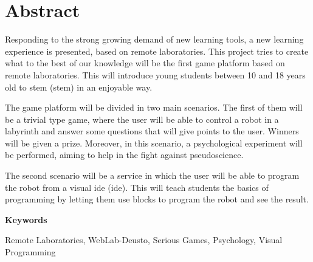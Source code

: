 \chapter*{Abstract}

Responding to the strong growing demand of new learning tools, a new learning experience is
presented, based on remote laboratories. This project tries to create what to the best of our
knowledge will be the first game platform based on remote laboratories. This will introduce young
students between 10 and 18 years old to \acrshort{stem} (\acrlong{stem}) in an enjoyable way.

The game platform will be divided in two main scenarios. The first of them will be a trivial type
game, where the user will be able to control a robot in a labyrinth and answer some questions that
will give points to the user. Winners will be given a prize. Moreover, in this scenario, a
psychological experiment will be performed, aiming to help in the fight against pseudoscience.

The second scenario will be a service in which the user will be able to program the robot from a
visual \acrshort{ide} (\acrlong{ide}). This will teach students the basics of programming by letting
them use blocks to program the robot and see the result.

\vspace{2em}

{\Large\bfseries\sffamily Keywords}
\vspace{3\medskipamount}

Remote Laboratories, WebLab-Deusto, Serious Games, Psychology, Visual Programming

